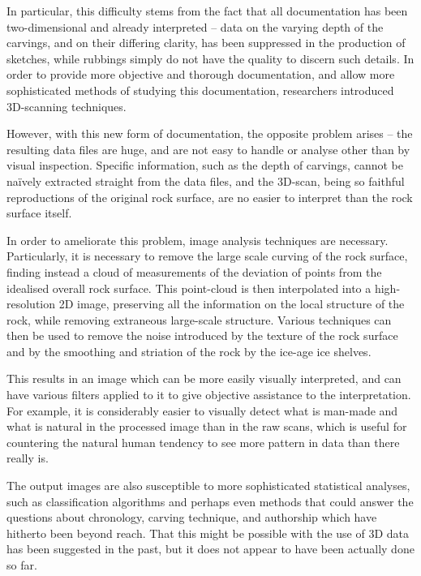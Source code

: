 \documentclass[a4paper,reqno,oneside]{amsart} %
\theoremstyle{definition}
\theoremstyle{remark}
\numberwithin{equation}{section}
\begin{document}
In particular, this difficulty stems from the fact that all documentation has been two-dimensional and already interpreted -- data on the varying depth of the carvings, and on their differing clarity, has been suppressed in the production of sketches, while rubbings simply do not have the quality to discern such details. In order to provide more objective and thorough documentation, and allow more sophisticated methods of studying this documentation, researchers introduced 3D-scanning techniques.

However, with this new form of documentation, the opposite problem arises -- the resulting data files are huge, and are not easy to handle or analyse other than by visual inspection. Specific information, such as the depth of carvings, cannot be naïvely extracted straight from the data files, and the 3D-scan, being so faithful reproductions of the original rock surface, are no easier to interpret than the rock surface itself.

In order to ameliorate this problem, image analysis techniques are necessary. Particularly, it is necessary to remove the large scale curving of the rock surface, finding instead a cloud of measurements of the deviation of points from the idealised overall rock surface. This point-cloud is then interpolated into a high-resolution 2D image, preserving all the information on the local structure of the rock, while removing extraneous large-scale structure. Various techniques can then be used to remove the noise introduced by the texture of the rock surface and by the smoothing and striation of the rock by the ice-age ice shelves.

This results in an image which can be more easily visually interpreted, and can have various filters applied to it to give objective assistance to the interpretation. For example, it is considerably easier to visually detect what is man-made and what is natural in the processed image than in the raw scans, which is useful for countering the natural human tendency to see more pattern in data than there really is.

The output images are also susceptible to more sophisticated statistical analyses, such as classification algorithms and perhaps even methods that could answer the questions about chronology, carving technique, and authorship which have hitherto been beyond reach. That this might be possible with the use of 3D data has been suggested in the past\cite{portugal}, but it does not appear to have been actually done so far.
\end{document}
